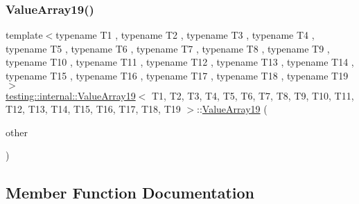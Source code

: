 \subsubsection{\texorpdfstring{ValueArray19()}{ValueArray19()}\hspace{0.1cm}{\footnotesize\ttfamily [2/2]}}
{\footnotesize\ttfamily template$<$typename T1 , typename T2 , typename T3 , typename T4 , typename T5 , typename T6 , typename T7 , typename T8 , typename T9 , typename T10 , typename T11 , typename T12 , typename T13 , typename T14 , typename T15 , typename T16 , typename T17 , typename T18 , typename T19 $>$ \\
\mbox{\hyperlink{classtesting_1_1internal_1_1_value_array19}{testing\+::internal\+::\+Value\+Array19}}$<$ T1, T2, T3, T4, T5, T6, T7, T8, T9, T10, T11, T12, T13, T14, T15, T16, T17, T18, T19 $>$\+::\mbox{\hyperlink{classtesting_1_1internal_1_1_value_array19}{Value\+Array19}} (\begin{DoxyParamCaption}\item[{const \mbox{\hyperlink{classtesting_1_1internal_1_1_value_array19}{Value\+Array19}}$<$ T1, T2, T3, T4, T5, T6, T7, T8, T9, T10, T11, T12, T13, T14, T15, T16, T17, T18, T19 $>$ \&}]{other }\end{DoxyParamCaption})\hspace{0.3cm}{\ttfamily [inline]}}



\subsection{Member Function Documentation}
\mbox{\label{classtesting_1_1internal_1_1_value_array19_a8ddd6c1de46e25310cf844895c7c8cf6}} 
